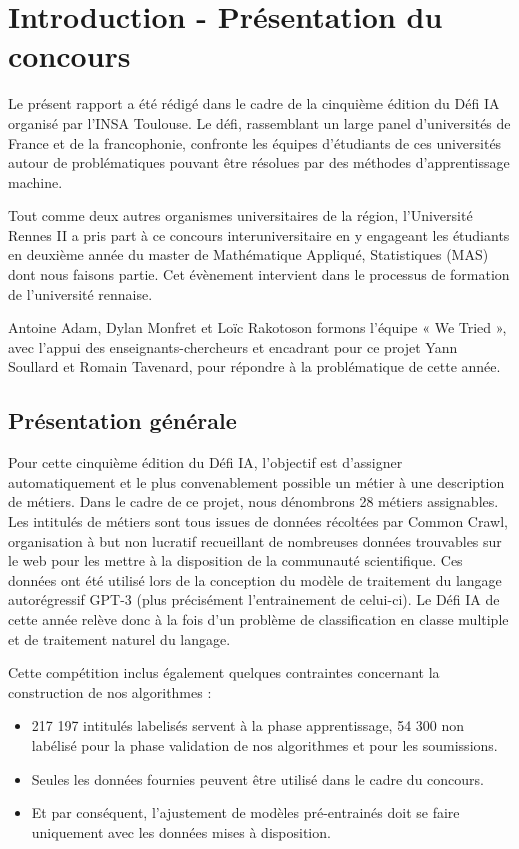 \chapter{Introduction - Présentation du concours}

Le présent rapport a été rédigé dans le cadre de la cinquième édition du Défi IA organisé par l’INSA Toulouse. Le défi, rassemblant un large panel d’universités de France et de la francophonie, confronte les équipes d’étudiants de ces universités autour de problématiques pouvant être résolues par des méthodes d’apprentissage machine.

Tout comme deux autres organismes universitaires de la région, l’Université Rennes II a pris part à ce concours interuniversitaire en y engageant les étudiants en deuxième année du master de Mathématique Appliqué, Statistiques (MAS) dont nous faisons partie. Cet évènement intervient dans le processus de formation de l’université rennaise.

Antoine Adam, Dylan Monfret et Loïc Rakotoson formons l’équipe « We Tried », avec l’appui des enseignants-chercheurs et encadrant pour ce projet Yann Soullard et Romain Tavenard, pour répondre à la problématique de cette année.

\section{Présentation générale}

Pour cette cinquième édition du Défi IA, l’objectif est d’assigner automatiquement et le plus convenablement possible un métier à une description de métiers. Dans le cadre de ce projet, nous dénombrons 28 métiers assignables. Les intitulés de métiers sont tous issues de données récoltées par Common Crawl, organisation à but non lucratif recueillant de nombreuses données trouvables sur le web pour les mettre à la disposition de la communauté scientifique. Ces données ont été utilisé lors de la conception du modèle de traitement du langage autorégressif GPT-3 (plus précisément l’entrainement de celui-ci). Le Défi IA de cette année relève donc à la fois d’un problème de classification en classe multiple et de traitement naturel du langage.

Cette compétition inclus également quelques contraintes concernant la construction de nos algorithmes :


\begin{itemize}
\item 217 197 intitulés labelisés servent à la phase apprentissage, 54 300 non labélisé pour la phase validation de nos algorithmes et pour les soumissions.
\item Seules les données fournies peuvent être utilisé dans le cadre du concours.
\item Et par conséquent, l’ajustement de modèles pré-entrainés doit se faire uniquement avec les données mises à disposition.
\end{itemize}

